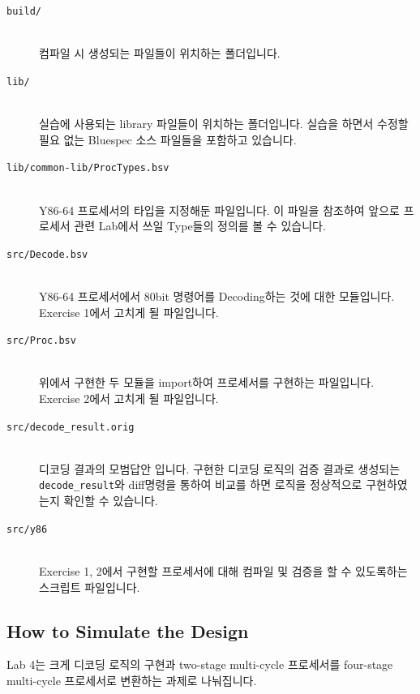 \documentclass{article}
\begin{document}
\begin{description}
\item [\texttt{build/}]\hfill \ \\
	컴파일 시 생성되는 파일들이 위치하는 폴더입니다.

\item [\texttt{lib/}]\hfill \ \\
	실습에 사용되는 library 파일들이 위치하는 폴더입니다.
	실습을 하면서 수정할 필요 없는 Bluespec 소스 파일들을 포함하고 있습니다.

\item [\texttt{lib/common-lib/ProcTypes.bsv}]\hfill \ \\
	Y86-64 프로세서의 타입을 지정해둔 파일입니다. 이 파일을 참조하여 앞으로 프로세서 관련
	Lab에서 쓰일 Type들의 정의를 볼 수 있습니다. 

\item [\texttt{src/Decode.bsv}]\hfill \ \\ 
	Y86-64 프로세서에서 80bit 명령어를 Decoding하는 것에 대한 모듈입니다. Exercise 1에서 
	고치게 될 파일입니다. 

\item [\texttt{src/Proc.bsv}]\hfill \ \\
	위에서 구현한 두 모듈을 import하여 프로세서를 구현하는 파일입니다. Exercise 2에서 
	고치게 될 파일입니다. 

\item [\texttt{src/decode\_result.orig}]\hfill \ \\
	디코딩 결과의 모범답안 입니다. 구현한 디코딩 로직의 검증 결과로 생성되는
	\texttt{decode\_result}와 diff명령을 통하여 비교를 하면 로직을 정상적으로 구현하였는지
	확인할 수 있습니다. 

\item [\texttt{src/y86}]\hfill \ \\
	Exercise 1, 2에서 구현할 프로세서에 대해 컴파일 및 검증을 할 수 있도록하는 스크립트 파일입니다.

\end{description}

\subsection{How to Simulate the Design}
Lab 4는 크게 디코딩 로직의 구현과 two-stage multi-cycle 프로세서를 four-stage multi-cycle 프로세서로
 변환하는 과제로 나눠집니다.
 
\end{document}

